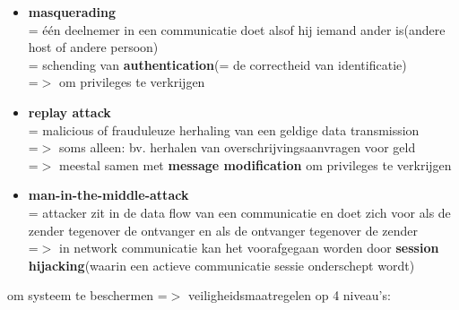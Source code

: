 \documentclass{report}
\begin{document}
\begin{itemize}
\item \textbf{masquerading}
\\= \'e\'en deelnemer in een communicatie doet alsof hij iemand ander is(andere host of andere persoon)
\\= schending van \textbf{authentication}(= de correctheid van identificatie)
\\=$>$ om privileges te verkrijgen
\item \textbf{replay attack}
\\= malicious of frauduleuze herhaling van een geldige data transmission
\\=$>$ soms alleen: bv. herhalen van overschrijvingsaanvragen voor geld
\\=$>$ meestal samen met \textbf{message modification} om privileges te verkrijgen
\item \textbf{man-in-the-middle-attack}
\\= attacker zit in de data flow van een communicatie en doet zich voor als de zender tegenover de ontvanger en als de ontvanger tegenover de zender
\\=$>$ in network communicatie kan het voorafgegaan worden door \textbf{session hijacking}(waarin een actieve communicatie sessie onderschept wordt)
\end{itemize}
om systeem te beschermen =$>$ veiligheidsmaatregelen op 4 niveau's:
\end{document}
